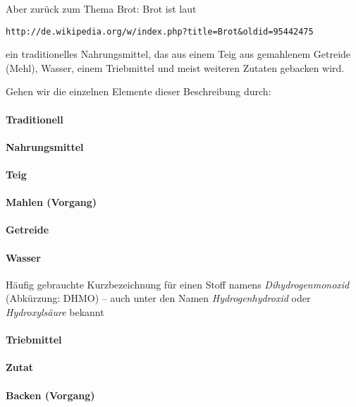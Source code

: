\documentclass{scrbook}
\begin{document}
Aber zurück zum Thema Brot: Brot ist laut \begin{verbatim}http://de.wikipedia.org/w/index.php?title=Brot&oldid=95442475\end{verbatim} ein traditionelles Nahrungsmittel, das aus einem Teig aus gemahlenem Getreide (Mehl), Wasser, einem Triebmittel und meist weiteren Zutaten gebacken wird.

Gehen wir die einzelnen Elemente dieser Beschreibung durch:

\paragraph{Traditionell} %

\paragraph{Nahrungsmittel} %

\paragraph{Teig} %

\paragraph{Mahlen (Vorgang)} %

\paragraph{Getreide} %

\paragraph{Wasser} Häufig gebrauchte Kurzbezeichnung für einen Stoff namens \emph{Dihydrogenmonoxid} (Abkürzung: DHMO) -- auch unter den Namen \emph{Hydrogenhydroxid} oder \emph{Hydroxylsäure} bekannt

\paragraph{Triebmittel} %

\paragraph{Zutat} %

\paragraph{Backen (Vorgang)} %
\end{document}
